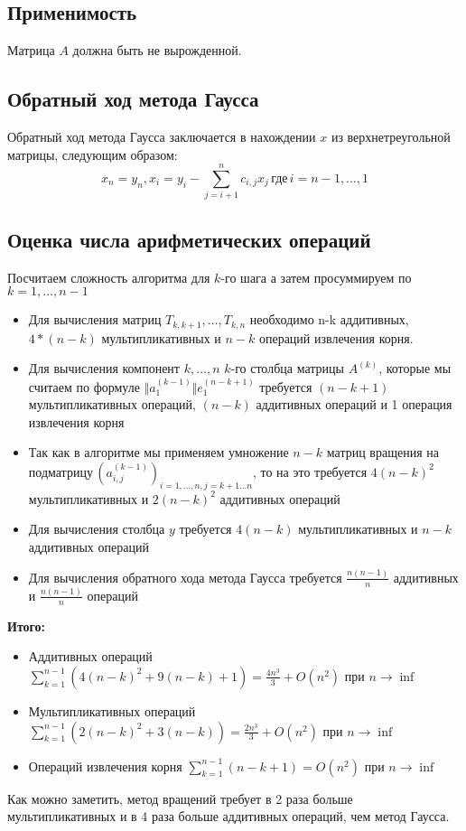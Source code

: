 \documentclass[a4paper, fontsize=14pt]{article}
\begin{document}
 	 	\subsection{Применимость}
 	 	Матрица $A$ должна быть не вырожденной.
 	 	
 	    \subsection{Обратный ход метода Гаусса}
 	    Обратный ход метода Гаусса заключается в нахождении $x$ из верхнетреугольной матрицы, следующим образом:
 	    $$x_n = y_n, x_i = y_i - \sum_{j = i+1}^{n} c_{i,j}x_j \,\text{где} \, i=n-1,\dots,1$$
 	    
     	\subsection{Оценка числа арифметических операций}
     	Посчитаем сложность алгоритма для $k$-го шага а затем просуммируем по $k=1,\dots,n-1$
     	\begin{itemize}
     		\item Для вычисления матриц $T_{k,k+1},\dots,T_{k,n}$ необходимо n-k аддитивных, $4*(n-k)$ мультипликативных и $n-k$ операций извлечения корня.
		    \item Для вычисления компонент $k,\dots,n$ $k$-го столбца матрицы $A^{(k)}$, которые мы считаем по формуле $\Vert a_1^{(k-1)} \Vert e_1^{(n-k+1)}$ требуется $(n-k+1)$ мультипликативных операций, $(n-k)$ аддитивных операций и 1 операция извлечения корня 
		    \item Так как в алгоритме мы применяем умножение $n-k$ матриц вращения на подматрицу$\,(a_{i,j}^{(k-1)})_{i = 1,\dots,n,j = k+1\dots n}$, то на это требуется $4(n-k)^2$ мультипликативных и $2(n-k)^2$ аддитивных операций
		   	\item Для вычисления столбца $y$ требуется $4(n-k)$ мультипликативных и $n-k$ аддитивных операций
		   	\item Для вычисления обратного хода метода Гаусса требуется $\frac{n(n-1)}{n}$ аддитивных и $\frac{n(n-1)}{n}$ операций
     	\end{itemize}
     \textbf{Итого:}
      \begin{itemize}
     	\item Аддитивных операций $\sum_{k=1}^{n-1}(4(n-k)^2 + 9(n-k) + 1) = \frac{4n^3}{3} + O(n^2)$ при $n\to\inf$
     	\item Мультипликативных операций $\sum_{k=1}^{n-1}(2(n-k)^2 + 3(n-k)) = \frac{2n^3}{3} + O(n^2)$ при $n\to\inf$
     	\item Операций извлечения корня $\sum_{k=1}^{n-1}(n-k+1) =  O(n^2)$ при $n\to\inf$
     \end{itemize}
 	 Как можно заметить, метод вращений требует в 2 раза больше мультипликативных и в 4 раза больше аддитивных операций, чем метод Гаусса.
     	
\end{document}
